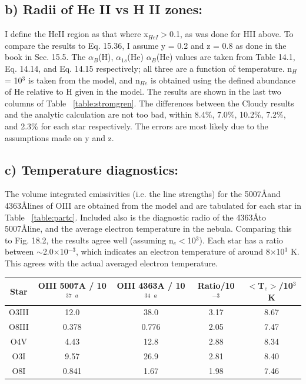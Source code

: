 \documentclass[a4paper]{article}
\begin{document}
\subsection{b) Radii of He II vs H II zones:}
I define the HeII region as that where x$_{HeI}$$>$0.1, as was done for HII above.
To compare the results to Eq. 15.36, I assume y = 0.2 and z = 0.8 as done in the 
book in Sec. 15.5. The $\alpha_{B}$(H), $\alpha_{1s}$(He) $\alpha_{B}$(He) values 
are taken from Table 14.1, Eq. 14.14, and Eq. 14.15 respectively; all three are a
function of temperature. n$_H$ = 10$^{3}$ is taken from the model, and n$_{He}$ is 
obtained using the defined abundance of He relative to H given in the model. The
results are shown in the last two columns of Table ~\ref{table:stromgren}. The
differences between the Cloudy results and the analytic calculation are not
too bad, within 8.4\%, 7.0\%, 10.2\%, 7.2\%, and 2.3\% for each star respectively.
The errors are most likely due to the assumptions made on y and z.

\subsection{c) Temperature diagnostics:}
The volume integrated emissivities (i.e. the line strengths) for the 
5007\AA and 4363\AA lines of OIII are obtained from the model and are tabulated
for each star in Table ~\ref{table:partc}. Included also is the 
diagnostic radio of the 4363\AA to 5007\AA line, and the average electron
temperature in the nebula. Comparing this to Fig. 18.2, the results agree well
(assuming n$_{e}<$10$^{3}$). Each star has a ratio between
$\sim$2.0$\times$10$^{-3}$, which indicates an electron temperature of around
8$\times$10$^{3}$ K. This agrees with the actual averaged electron temperature.

\begin{tabular}{c c c c c}
\label{table:partc}
Star & OIII 5007A / 10$^{37}$ $^{a}$ & OIII 4363A / 10$^{34}$ $^{a}$ & Ratio/10$^{-3}$
& $<$T$_{e}>$/10$^{3}$ K \\
\hline
O3III & 12.0 & 38.0 & 3.17 & 8.67 \\
O8III & 0.378 & 0.776 & 2.05 & 7.47 \\
O4V & 4.43 & 12.8 & 2.88 & 8.34 \\
O3I & 9.57 & 26.9 & 2.81 & 8.40 \\
O8I & 0.841 & 1.67 & 1.98 & 7.46\\
\hline 
\end{tabular}
\end{document}
